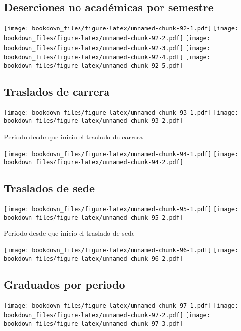 \documentclass[]{article}
\theoremstyle{definition}
\theoremstyle{definition}
\theoremstyle{definition}
\theoremstyle{remark}
\begin{document}
\subsection{Deserciones no académicas por
semestre}\label{deserciones-no-academicas-por-semestre-1}

\texttt{[image: bookdown\_files/figure-latex/unnamed-chunk-92-1.pdf]}
\texttt{[image: bookdown\_files/figure-latex/unnamed-chunk-92-2.pdf]}
\texttt{[image: bookdown\_files/figure-latex/unnamed-chunk-92-3.pdf]}
\texttt{[image: bookdown\_files/figure-latex/unnamed-chunk-92-4.pdf]}
\texttt{[image: bookdown\_files/figure-latex/unnamed-chunk-92-5.pdf]}

\subsection{Traslados de carrera}\label{traslados-de-carrera-1}

\texttt{[image: bookdown\_files/figure-latex/unnamed-chunk-93-1.pdf]}
\texttt{[image: bookdown\_files/figure-latex/unnamed-chunk-93-2.pdf]}

Periodo desde que inicio el traslado de carrera

\texttt{[image: bookdown\_files/figure-latex/unnamed-chunk-94-1.pdf]}
\texttt{[image: bookdown\_files/figure-latex/unnamed-chunk-94-2.pdf]}

\subsection{Traslados de sede}\label{traslados-de-sede-1}

\texttt{[image: bookdown\_files/figure-latex/unnamed-chunk-95-1.pdf]}
\texttt{[image: bookdown\_files/figure-latex/unnamed-chunk-95-2.pdf]}

Periodo desde que inicio el traslado de sede

\texttt{[image: bookdown\_files/figure-latex/unnamed-chunk-96-1.pdf]}
\texttt{[image: bookdown\_files/figure-latex/unnamed-chunk-96-2.pdf]}

\subsection{Graduados por periodo}\label{graduados-por-periodo-1}

\texttt{[image: bookdown\_files/figure-latex/unnamed-chunk-97-1.pdf]}
\texttt{[image: bookdown\_files/figure-latex/unnamed-chunk-97-2.pdf]}
\texttt{[image: bookdown\_files/figure-latex/unnamed-chunk-97-3.pdf]}
\end{document}
